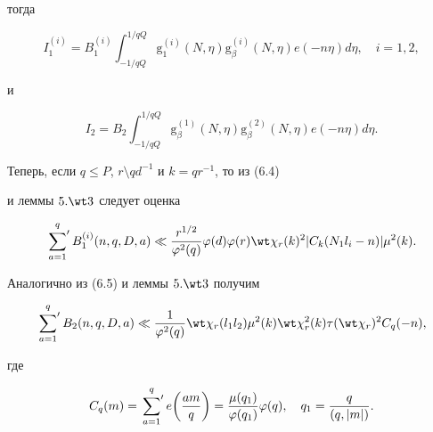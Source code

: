 тогда


\begin{equation}


I_1^{(i)}=B_1^{(i)}\int_{-1/qQ}^{1/qQ}\mathrm g_1^{(i)}(N,\eta)


\mathrm g_{\beta}^{(i)}


(N,\eta) e(-n\eta)d\eta,\quad i=1,2,


\end{equation}


и


\begin{equation}


I_2=B_2\int_{-1/qQ}^{1/qQ}\mathrm g_{\beta}^{(1)}(N,\eta)


\mathrm g_{\beta}^{(2)}


(N,\eta)e(-n\eta)d\eta.


\end{equation}





Теперь, если $q\le P$, $r\setminus qd^{-1}$ и $k=qr^{-1}$, то из (6.4)


и леммы $5.\wt 3$ следует оценка


$$


\sideset{}{'}\sum_{a=1}^qB_1^{(i)}(n,q,D,a)\ll \frac{r^{1/2}}{\varphi^2(q)}


\varphi(d)\varphi(r)\wt \chi_r(k)^2|C_k(N_1l_i-n)|\mu^2(k).


$$





Аналогично из (6.5) и леммы $5.\wt 3$ получим


\begin{equation}


\sideset{}{'}\sum_{a=1}^qB_2(n,q,D,a)\ll \frac{1}{\varphi^2(q)}


\wt \chi_r(l_1l_2)\mu^2(k)\wt \chi_r^2(k)\tau(\wt \chi_r)^2


C_q(-n),


\end{equation}


где 


\begin{equation}


C_q(m)=\sideset{}{'}\sum_{a=1}^q e\bigg(\frac{am}q\bigg)=


\frac{\mu(q_1)}{\varphi(q_1)}


\varphi(q),\quad q_1=\frac{q}{(q,|m|)}.


\end{equation}





